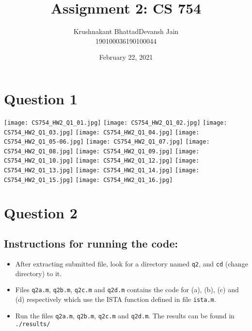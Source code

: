 \documentclass[fleqn, 11pt]{article}
\title{Assignment 2: CS 754}
\author{ 
\begin{tabular}{|c|c|}
     \hline
     \textsf{Krushnakant Bhattad} & \textsf{Devansh Jain} \\
     \hline
     \textsf{190100036} & \textsf{190100044}\\
     \hline
\end{tabular}
}
\date{February 22, 2021}
\begin{document}
\maketitle
\tableofcontents
\thispagestyle{empty}
\setcounter{page}{0}

\newpage
\section*{Question 1}
\setcounter{equation}{0}


\texttt{[image: CS754\_HW2\_Q1\_01.jpg]} \newpage
\texttt{[image: CS754\_HW2\_Q1\_02.jpg]} \newpage
\texttt{[image: CS754\_HW2\_Q1\_03.jpg]} \newpage
\texttt{[image: CS754\_HW2\_Q1\_04.jpg]} \newpage
\texttt{[image: CS754\_HW2\_Q1\_05-06.jpg]} \newpage
\texttt{[image: CS754\_HW2\_Q1\_07.jpg]} \newpage
\texttt{[image: CS754\_HW2\_Q1\_08.jpg]} \newpage
\texttt{[image: CS754\_HW2\_Q1\_09.jpg]} \newpage
\texttt{[image: CS754\_HW2\_Q1\_10.jpg]} \newpage %
\texttt{[image: CS754\_HW2\_Q1\_12.jpg]} \newpage
\texttt{[image: CS754\_HW2\_Q1\_13.jpg]} \newpage
\texttt{[image: CS754\_HW2\_Q1\_14.jpg]} \newpage
\texttt{[image: CS754\_HW2\_Q1\_15.jpg]} \newpage
\texttt{[image: CS754\_HW2\_Q1\_16.jpg]} 


\newpage
\section*{Question 2}
\setcounter{equation}{0}

\subsection*{Instructions for running the code:}
\begin{itemize}[noitemsep]
    \item After extracting submitted file, look for a directory named \texttt{q2}, and \texttt{cd} (change directory) to it.
    \item Files \texttt{q2a.m}, \texttt{q2b.m}, \texttt{q2c.m} and \texttt{q2d.m} contains the code for (a), (b), (c) and (d) respectively which use the ISTA function defined in file \texttt{ista.m}.
    \item Run the files \texttt{q2a.m}, \texttt{q2b.m}, \texttt{q2c.m} and \texttt{q2d.m}. The results can be found in \texttt{./results/} 
\end{itemize}
\end{document}
